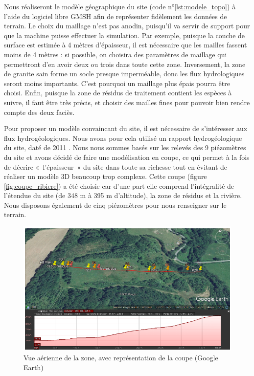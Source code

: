 \documentclass{article}
\begin{document}
Nous réaliseront le modèle géographique du site (code n°\ref{lst:modele_topo}) à l'aide du logiciel libre GMSH \cite{gmsh_site} afin de représenter fidèlement les données de terrain. Le choix du maillage n'est pas anodin, puisqu'il va servir de support pour que la machine puisse effectuer la simulation. Par exemple, puisque la couche de surface est estimée à 4 mètres d'épaisseur, il est nécessaire que les mailles fassent moins de 4 mètres : si possible, on choisira des paramètres de maillage qui permettront d'en avoir deux ou trois dans toute cette zone. Inversement, la zone de granite sain forme un socle presque imperméable, donc les flux hydrologiques seront moins importants. C'est pourquoi un maillage plus épais pourra être choisi. Enfin, puisque la zone de résidus de traitement contient les espèces à suivre, il faut être très précis, et choisir des mailles fines pour pouvoir bien rendre compte des deux faciès.

Pour proposer un modèle convaincant du site, il est nécessaire de s’intéresser aux flux hydrogéologiques. Nous avons pour cela utilisé un rapport hydrogéologique du site, daté de 2011 \cite{societe_areva_nc_etude_2011}. Nous nous sommes basés sur les relevés des 9 piézomètres du site et avons décidé de faire une modélisation en coupe, ce qui permet à la fois de décrire « l'épaisseur » du site dans toute sa richesse tout en évitant de réaliser un modèle 3D beaucoup trop complexe. Cette coupe (figure \ref{fig:coupe_ribiere}) a été choisie car d'une part elle comprend l'intégralité de l'étendue du site (de 348 m à 395 m d'altitude), la zone de résidus et la rivière. Nous disposons également de cinq piézomètres pour nous renseigner sur le terrain.

\begin{figure}[H]
    \centering
    \includegraphics[width=0.8\linewidth]{III_B_3_1.png}
    \caption{Vue aérienne de la zone, avec représentation de la coupe (Google Earth)}
    \label{fig:earth_ribière}
\end{figure}
\end{document}
